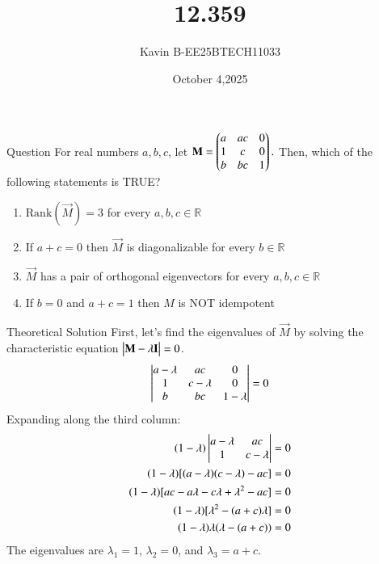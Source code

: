\documentclass{beamer}
\begin{document}
\title 
{12.359}
\date{October 4,2025}


\author 
{Kavin B-EE25BTECH11033}






\frame{\titlepage}
\begin{frame}{Question}
For real numbers $a, b, c$, let 
$\mathbf{M} = \begin{pmatrix}
a & ac & 0 \\
1 & c  & 0 \\
b & bc & 1\end{pmatrix}.$
Then, which of the following statements is {TRUE}?
\begin{enumerate}
\item $\text{Rank}(\vec{M}) = 3$ for every $a,b,c \in \mathbb{R}$
\item If $a+c=0$ then $\vec{M}$ is diagonalizable for every $b \in \mathbb{R}$
\item $\vec{M}$ has a pair of orthogonal eigenvectors for every $a,b,c \in \mathbb{R}$
\item If $b=0$ and $a+c=1$ then $M$ is {NOT} idempotent
\end{enumerate}
\end{frame}



\begin{frame}{Theoretical Solution}
First, let's find the eigenvalues of $\vec{M}$ by solving the characteristic equation $\begin{vmatrix}\mathbf{M} - \lambda \mathbf{I}\end{vmatrix} = 0$.
\begin{align}  
\begin{mydet}{ a-\lambda & ac & 0 \\ 1 & c-\lambda & 0 \\ b & bc & 1-\lambda }\end{mydet} = 0 
\end{align}
Expanding along the third column:
\begin{align*}
(1-\lambda) \begin{mydet}{ a-\lambda & ac \\ 1 & c-\lambda }\end{mydet} &= 0 \\
(1-\lambda) [(a-\lambda)(c-\lambda) - ac] &= 0 \\
(1-\lambda) [ac - a\lambda - c\lambda + \lambda^2 - ac] &= 0 \\
(1-\lambda) [\lambda^2 - (a+c)\lambda] &= 0 \\
(1-\lambda) \lambda (\lambda - (a+c)) &= 0
\end{align*}
The eigenvalues are $\lambda_1 = 1$, $\lambda_2 = 0$, and $\lambda_3 = a+c$.\\
\bigskip
\end{frame}
\end{document}

